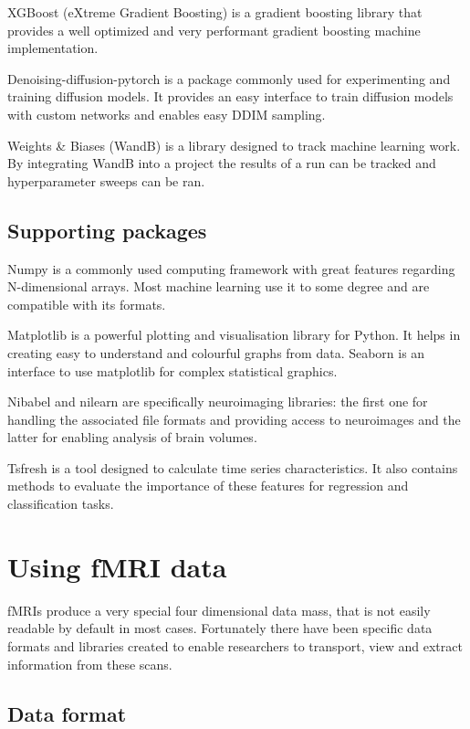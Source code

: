 	XGBoost (eXtreme Gradient Boosting) is a gradient boosting library that provides a well optimized and very performant gradient boosting machine implementation.
	
	Denoising-diffusion-pytorch is a package commonly used for experimenting and training diffusion models. It provides an easy interface to train diffusion models with custom networks and enables easy DDIM sampling.
	
	Weights \& Biases (WandB) is a library designed to track machine learning work. By integrating WandB into a project the results of a run can be tracked and hyperparameter sweeps can be ran.
	
	
	\subsection{Supporting packages}
	Numpy is a commonly used computing framework with great features regarding N-dimensional arrays. Most machine learning use it to some degree and are compatible with its formats.
	
	Matplotlib is a powerful plotting and visualisation library for Python. It helps in creating easy to understand and colourful graphs from data. Seaborn is an interface to use matplotlib for complex statistical graphics.
	
	Nibabel and nilearn are specifically neuroimaging libraries: the first one for handling the associated file formats and providing access to neuroimages and the latter for enabling analysis of brain volumes.
	
	Tsfresh is a tool designed to calculate time series characteristics. It also contains methods to evaluate the importance of these features for regression and classification tasks.
	
	
\section{Using fMRI data}

	fMRIs produce a very special four dimensional data mass, that is not easily readable by default in most cases. Fortunately there have been specific data formats and libraries created to enable researchers to transport, view and extract information from these scans.

	\subsection{Data format}
	
